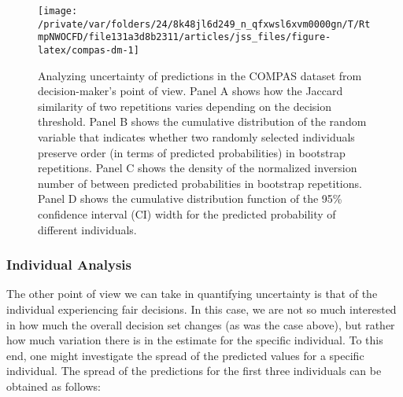 \documentclass[
  nojss]{jss}
\begin{document}
\begin{CodeChunk}
\begin{figure}

{\centering \texttt{[image: /private/var/folders/24/8k48jl6d249\_n\_qfxwsl6xvm0000gn/T/RtmpNWOCFD/file131a3d8b2311/articles/jss\_files/figure-latex/compas-dm-1]} 

}

\caption[Analyzing uncertainty of predictions in the COMPAS dataset from decision-maker's point of view]{Analyzing uncertainty of predictions in the COMPAS dataset from decision-maker's point of view. Panel A shows how the Jaccard similarity of two repetitions varies depending on the decision threshold. Panel B shows the cumulative distribution of the random variable that indicates whether two randomly selected individuals preserve order (in terms of predicted probabilities) in bootstrap repetitions. Panel C shows the density of the normalized inversion number of between predicted probabilities in bootstrap repetitions. Panel D shows the cumulative distribution function of the 95\% confidence interval (CI) width for the predicted probability of different individuals.}\label{fig:compas-dm}
\end{figure}
\end{CodeChunk}

\hypertarget{individual-analysis}{%
\subsubsection{Individual Analysis}\label{individual-analysis}}

The other point of view we can take in quantifying uncertainty is that
of the individual experiencing fair decisions. In this case, we are not
so much interested in how much the overall decision set changes (as was
the case above), but rather how much variation there is in the estimate
for the specific individual. To this end, one might investigate the
spread of the predicted values for a specific individual. The spread of
the predictions for the first three individuals can be obtained as
follows:

\begin{CodeChunk}
\end{CodeChunk}
\end{document}
